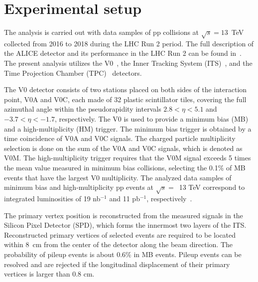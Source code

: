 

\section{Experimental setup}
\label{sec:experiment}
\label{sec:experiment}

The analysis is carried out with data samples of pp collisions at $\sqrt{s} = 13$~TeV collected from 2016 to 2018 during the LHC Run 2 period. The full description of the ALICE detector and its performance in the LHC Run 2 can be found in~\cite{Aamodt:2008zz,Abelev:2014ffa}. The present analysis utilizes the V0~\cite{Abbas:2013taa}, the Inner Tracking System (ITS)~\cite{aliceITS}, and the Time Projection Chamber (TPC)~\cite{aliceTPC} detectors.

The V0 detector consists of two stations placed on both sides of the interaction point, V0A and V0C, each made of 32 plastic scintillator tiles, covering the full azimuthal angle within the pseudorapidity intervals $2.8 < \eta < 5.1$ and $-3.7 < \eta < -1.7$, respectively. The V0 is used to provide a minimum bias (MB) and a high-multiplicity (HM) trigger. The minimum bias trigger is obtained by a time coincidence of V0A and V0C signals. The charged particle multiplicity selection is done on the sum of the V0A and V0C signals, which is denoted as V0M. The high-multiplicity trigger requires that the V0M signal exceeds 5 times the mean value measured in minimum bias collisions, selecting the 0.1\% of MB events that have the largest V0 multiplicity. The analyzed data samples of minimum bias and high-multiplicity pp events at $\sqrt{s}=$~13 TeV correspond to integrated luminosities of 19 nb$^{-1}$ and 11 pb$^{-1}$, respectively~\cite{ALICE-PUBLIC-2016-002}.

The primary vertex position is reconstructed from the measured signals in the Silicon Pixel Detector (SPD), which forms the innermost two layers of the ITS. Reconstructed primary vertices of selected events are required to be located within 8~cm from the center of the detector along the beam direction. The probability of pileup events is about 0.6\% in MB events. Pileup events can be resolved and are rejected if the longitudinal displacement of their primary vertices is larger than 0.8 cm.

